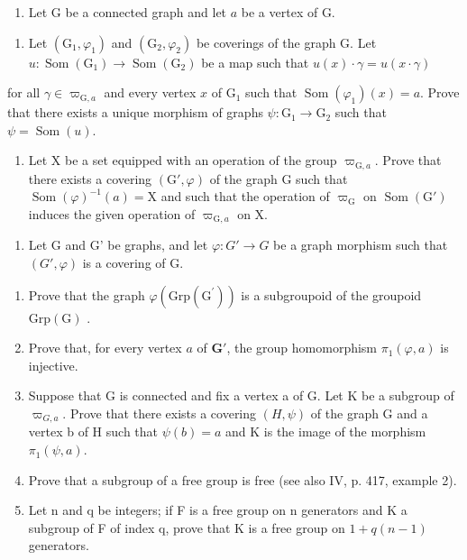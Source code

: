 \begin{enumerate}
\def\labelenumi{\arabic{enumi})}
\setcounter{enumi}{7}
\tightlist
\item
  Let G be a connected graph and let \(a\) be a vertex of G.
\end{enumerate}

\begin{enumerate}
\def\labelenumi{\alph{enumi})}
\tightlist
\item
  Let \((\mathrm{G}_{1},\varphi_{1})\) and \((\mathrm{G}_{2},\varphi_{2})\) be coverings of the graph G. Let \(u\colon\operatorname{Som}(\mathrm{G}_{1})\to\operatorname{Som}(\mathrm{G}_{2})\) be a map such that \(u(x)\cdot\gamma=u(x\cdot\gamma)\)
\end{enumerate}

for all \(\gamma \in \varpi_{\mathrm{G},a}\) and every vertex \(x\) of \(\mathrm{G}_1\) such that \(\operatorname{Som}(\varphi_1)(x) = a\). Prove that there exists a unique morphism of graphs \(\psi: \mathrm{G}_1 \to \mathrm{G}_2\) such that \(\psi = \operatorname{Som}(u)\).

\begin{enumerate}
\def\labelenumi{\alph{enumi})}
\setcounter{enumi}{1}
\tightlist
\item
  Let X be a set equipped with an operation of the group \(\varpi_{\mathrm{G},a}\). Prove that there exists a covering \((\mathrm{G}',\varphi)\) of the graph G such that \(\operatorname{Som}(\varphi)^{-1}(a) = \mathrm{X}\) and such that the operation of \(\varpi_{\mathrm{G}}\) on \(\operatorname{Som}(\mathrm{G}')\) induces the given operation of \(\varpi_{\mathrm{G},a}\) on X.
\end{enumerate}

\begin{enumerate}
\def\labelenumi{\arabic{enumi})}
\setcounter{enumi}{8}
\tightlist
\item
  Let G and G' be graphs, and let \(\varphi\colon G'\to G\) be a graph morphism such that \((G',\varphi)\) is a covering of G.
\end{enumerate}

\begin{enumerate}
\def\labelenumi{\alph{enumi})}
\item
  Prove that the graph \(\varphi(\mathrm{Grp}(\mathrm{G}^{\prime}))\) is a subgroupoid of the groupoid \(\mathrm{Grp}(\mathrm{G})\) .
\item
  Prove that, for every vertex \(a\) of \(\mathbf{G}'\), the group homomorphism \(\pi_1(\varphi, a)\) is injective.
\item
  Suppose that G is connected and fix a vertex a of G. Let K be a subgroup of \(\varpi_{G,a}\). Prove that there exists a covering \((H,\psi)\) of the graph G and a vertex b of H such that \(\psi(b)=a\) and K is the image of the morphism \(\pi_{1}(\psi,a)\).
\item
  Prove that a subgroup of a free group is free (see also IV, p. 417, example 2).
\item
  Let n and q be integers; if F is a free group on n generators and K a subgroup of F of index q, prove that K is a free group on \(1 + q(n - 1)\) generators.
\end{enumerate}

